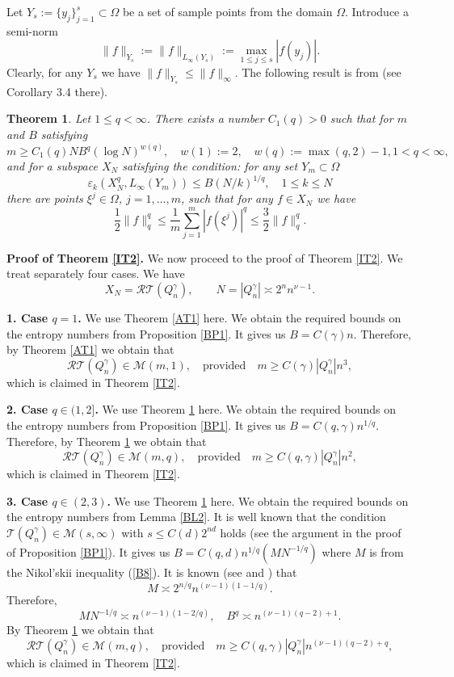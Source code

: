 \documentclass[12pt]{article}
\def \Tr{\mathcal T}
\def \cR{\mathcal R}
\def \cM{\mathcal M}
\def \e{\varepsilon}
\def\ga{\gamma}
\newtheorem{Theorem}{Theorem}[section]
\numberwithin{equation}{section}
\newcommand{\be}{\begin{equation}}
\newcommand{\ee}{\end{equation}}
\begin{document}
Let $Y_s:= \{y_j\}_{j=1}^s \subset \Omega$ be a set of sample points from the domain $\Omega$. Introduce a semi-norm 
$$
\|f\|_{Y_s}:=\|f\|_{L_{\infty}(Y_s)} := \max_{1\le j\le s} |f(y_j)|.
$$
Clearly, for any $Y_s$ we have $\|f\|_{Y_s} \le \|f\|_\infty$. 
The following result is from \cite{Kos} (see Corollary 3.4 there). 

\begin{Theorem}\label{AT3} Let $1\le q<\infty$. There exists a number $C_1(q)>0$ such that for $m$ and $B$ satisfying 
$$
m\ge C_1(q) NB^q (\log N)^{w(q)},\quad w(1):=2, \quad w(q) := \max(q,2)-1, 1<q<\infty,
$$
and for a subspace $X_N$ satisfying the condition: for any set $Y_m\subset \Omega$
\be\label{A3}
\e_k(X^q_N,L_{\infty}(Y_m)) \le  B (N/k)^{1/q}, \quad 1\leq k\le N
\ee
 there are
 points $\xi^j\in \Omega$, $j=1,\dots,m$,   such that for any $f\in X_N$
we have
$$
\frac{1}{2}\|f\|_q^q \le \frac{1}{m}\sum_{j=1}^m |f(\xi^j)|^q \le \frac{3}{2}\|f\|_q^q.
$$
\end{Theorem}

{\bf Proof of Theorem \ref{IT2}.} We now proceed to the proof of Theorem \ref{IT2}. We treat separately four cases. We have 
\be\label{A3}
X_N = \cR\Tr(Q_n^\ga),\qquad  N=|Q_n^\ga| \asymp 2^n n^{\nu-1}.
\ee

{\bf 1. Case $q=1$.} We use Theorem \ref{AT1} here. We obtain the required bounds on the entropy numbers from Proposition \ref{BP1}.  It gives us $B=C(\ga)n$. Therefore, by Theorem \ref{AT1} we obtain that
\be\label{A4}
\cR\Tr(Q_n^\ga) \in \cM(m,1), \quad \text{provided}\quad m \ge C(\ga)|Q_n^\ga| n^3,
\ee
which is claimed in Theorem \ref{IT2}.

{\bf 2. Case $q\in (1,2]$.} We use Theorem \ref{AT3} here. We obtain the required bounds on the entropy numbers from Proposition \ref{BP1}.  It gives us $B=C(q,\ga)n^{1/q}$. Therefore, by Theorem \ref{AT3} we obtain that
\be\label{A5}
\cR\Tr(Q_n^\ga) \in \cM(m,q), \quad \text{provided}\quad m \ge C(q,\ga)|Q_n^\ga| n^2,
\ee
which is claimed in Theorem \ref{IT2}.

{\bf 3. Case $q\in (2,3)$.} We use Theorem \ref{AT3} here. We obtain the required bounds on the entropy numbers from Lemma \ref{BL2}. It is well known that the condition $\Tr(Q_n^\ga) \in \cM(s,\infty)$ with $s\le C(d)2^{nd}$ holds (see the argument in the proof of Proposition \ref{BP1}). It gives us $B=C(q,d)n^{1/q}(MN^{-1/q})$ where $M$ is from the Nikol'skii inequality (\ref{B8}). It is known (see \cite{Tem4} and \cite{Tmon})
that 
$$
M\asymp 2^{n/q} n^{(\nu-1)(1-1/q)}.
$$
Therefore,
$$
MN^{-1/q} \asymp n^{(\nu-1)(1-2/q)}, \quad B^q\asymp n^{(\nu-1)(q-2)+1}.
$$
By Theorem \ref{AT3} we obtain that
\be\label{A6}
\cR\Tr(Q_n^\ga) \in \cM(m,q), \quad \text{provided}\quad m \ge C(q,\ga)|Q_n^\ga| n^{(\nu-1)(q-2) + q},
\ee
which is claimed in Theorem \ref{IT2}.
\end{document}
